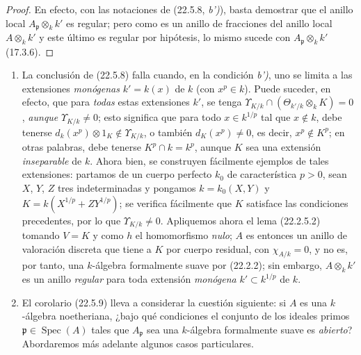 \begin{proof}
En efecto, con las notaciones de (22.5.8, \emph{b')}), basta demostrar que
el anillo local $A_{\mathfrak p}\otimes_kk'$ es regular; pero como es un
anillo de fracciones del anillo local $A\otimes_kk'$ y este último es
regular por hipótesis, lo mismo sucede con $A_{\mathfrak p}\otimes_kk'$
(17.3.6).
\end{proof}

\begin{remark}[22.5.10]
\label{0.22.5.10-fr}
\begin{enumerate}
  \item[\rm(i)] La conclusión de (22.5.8) falla cuando, en la
  condición \emph{b')}, uno se limita a las extensiones \emph{monógenas} $k'=k(x)$ de $k$
  (con $x^p\in k$). Puede suceder, en efecto, que para \emph{todas} estas extensiones $k'$,
  se tenga
  $\Upsilon_{K/k}\cap(\Theta_{k'/k}\otimes_kK)=0$, \emph{aunque}
  $\Upsilon_{K/k}\neq0$; esto significa que para todo $x\in k^{1/p}$ tal que
  $x\notin k$, debe tenerse
  $d_k(x^p)\otimes1_K\notin\Upsilon_{K/k}$, o también $d_K(x^p)\neq0$,
  es decir, $x^p\notin K^p$; en otras palabras, debe tenerse
  $K^p\cap k=k^p$, aunque $K$ sea una extensión \emph{inseparable} de $k$.
  Ahora bien, se construyen fácilmente ejemplos de tales extensiones: partamos de un
  cuerpo perfecto $k_0$ de característica $p>0$, sean $X$, $Y$, $Z$ tres
  indeterminadas y pongamos $k=k_0(X,Y)$ y
  $K=k(X^{1/p}+ZY^{1/p})$; se verifica fácilmente que $K$ satisface las condiciones
  precedentes, por lo que $\Upsilon_{K/k}\neq0$. Apliquemos ahora el lema
  (22.2.5.2) tomando $V=K$ y como $h$ el homomorfismo \emph{nulo}; $A$ es entonces
  un anillo de valoración discreta que tiene a $K$ por cuerpo residual, con
  $\chi_{A/k}=0$, y no es, por tanto, una $k$-álgebra formalmente suave por
  (22.2.2); sin embargo, $A\otimes_kk'$ es un anillo \emph{regular} para toda
  extensión \emph{monógena} $k'\subset k^{1/p}$ de $k$.


  \item[\rm(ii)] El corolario (22.5.9) lleva a considerar la cuestión
  siguiente: si $A$ es una $k$-álgebra noetheriana, ¿bajo qué condiciones
  el conjunto de los ideales primos $\mathfrak p\in\operatorname{Spec}(A)$ tales que
  $A_{\mathfrak p}$ sea una $k$-álgebra formalmente suave es
  \emph{abierto}? Abordaremos más adelante algunos casos particulares.
\end{enumerate}
\end{remark}
